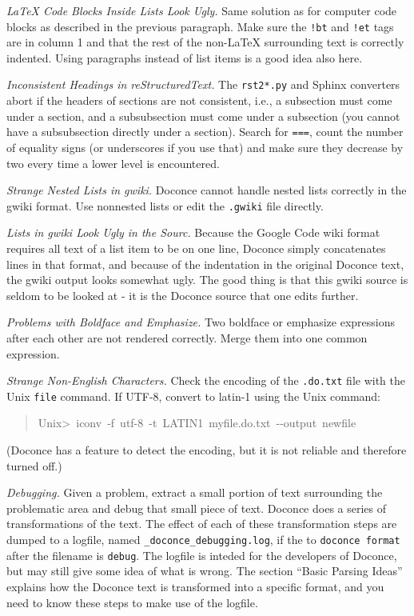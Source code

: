 \documentclass[a4paper,english]{article}
\begin{document}
\emph{LaTeX Code Blocks Inside Lists Look Ugly.} Same solution as for computer code blocks as described in the
previous paragraph. Make sure the \texttt{!bt} and \texttt{!et} tags are in column 1
and that the rest of the non-LaTeX surrounding text is correctly indented.
Using paragraphs instead of list items is a good idea also here.

\emph{Inconsistent Headings in reStructuredText.} The \texttt{rst2*.py} and Sphinx converters abort if the headers of sections
are not consistent, i.e., a subsection must come under a section,
and a subsubsection must come under a subsection (you cannot have
a subsubsection directly under a section). Search for \texttt{===},
count the number of equality signs (or underscores if you use that)
and make sure they decrease by two every time a lower level is encountered.

\emph{Strange Nested Lists in gwiki.} Doconce cannot handle nested lists correctly in the gwiki format.
Use nonnested lists or edit the \texttt{.gwiki} file directly.

\emph{Lists in gwiki Look Ugly in the Sourc.} Because the Google Code wiki format requires all text of a list item to
be on one line, Doconce simply concatenates lines in that format,
and because of the indentation in the original Doconce text, the gwiki
output looks somewhat ugly. The good thing is that this gwiki source
is seldom to be looked at - it is the Doconce source that one edits
further.

\emph{Problems with Boldface and Emphasize.} Two boldface or emphasize expressions after each other are not rendered
correctly. Merge them into one common expression.

\emph{Strange Non-English Characters.} Check the encoding of the \texttt{.do.txt} file with the Unix \texttt{file} command.
If UTF-8, convert to latin-1 using the Unix command:
%
\begin{quote}{\ttfamily \raggedright \noindent
Unix>~iconv~-f~utf-8~-t~LATIN1~myfile.do.txt~-{}-output~newfile
}
\end{quote}

(Doconce has a feature to detect the encoding, but it is not reliable and
therefore turned off.)

\emph{Debugging.} Given a problem, extract a small portion of text surrounding the
problematic area and debug that small piece of text. Doconce does a
series of transformations of the text. The effect of each of these
transformation steps are dumped to a logfile, named
\texttt{\_doconce\_debugging.log}, if the to \texttt{doconce format} after the filename
is \texttt{debug}. The logfile is inteded for the developers of Doconce, but
may still give some idea of what is wrong.  The section ``Basic Parsing
Ideas'' explains how the Doconce text is transformed into a specific
format, and you need to know these steps to make use of the logfile.
\end{document}
